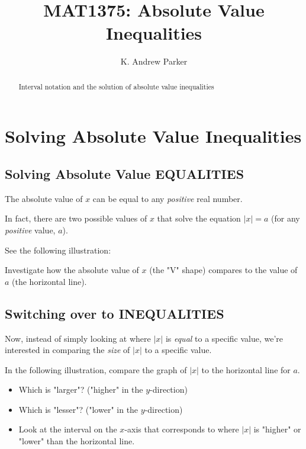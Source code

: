 \documentclass{ximera}
\title{MAT1375: Absolute Value Inequalities}
\author{K. Andrew Parker}
\begin{document}
\begin{abstract}
Interval notation and the solution of absolute value inequalities
\end{abstract}

\maketitle

\section{Solving Absolute Value Inequalities}

\subsection{Solving Absolute Value EQUALITIES}

The absolute value of $x$ can be equal to any \emph{positive} real number.

In fact, there are two possible values of $x$ that solve the equation $|x|=a$ (for any \emph{positive} value, $a$).

See the following illustration:

Investigate how the absolute value of $x$ (the "V" shape) compares to the value of $a$ (the horizontal line).

\begin{center}
\end{center}

\subsection{Switching over to INEQUALITIES}

Now, instead of simply looking at where $|x|$ is \emph{equal} to a specific value, we're interested in comparing the \emph{size} of $|x|$ to a specific value.

In the following illustration, compare the graph of $|x|$ to the horizontal line for $a$.
\begin{itemize}
\item Which is "larger"? ("higher" in the $y$-direction)
\item Which is "lesser"? ("lower" in the $y$-direction)
\item Look at the interval on the $x$-axis that corresponds to where $|x|$ is "higher" or "lower" than the horizontal line.
\end{itemize}
\end{document}
